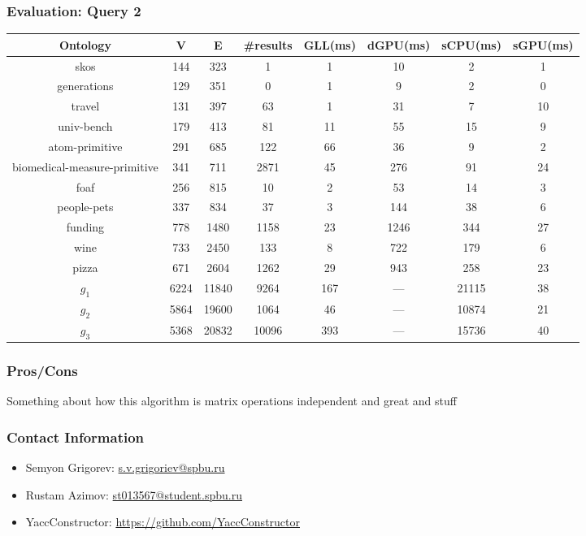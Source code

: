 \documentclass[xcolor=table]{beamer}
\begin{document}
\begin{frame}
  \transwipe[direction=90]
  \frametitle{Evaluation: Query 2}         
\begin{tabular}{ | c | c | c | c | c | c | c | c |}
\hline
Ontology & V & E & \#results & GLL(ms) & dGPU(ms) & sCPU(ms) & sGPU(ms)\\
\hline 
\hline
skos        & 144 & 323 & 1 & 1 & 10 & 2 & 1\\
generations & 129 & 351 & 0 & 1 & 9 & 2 & 0\\
travel      & 131 & 397 & 63 & 1 & 31 & 7 & 10\\
univ-bench  & 179 & 413 & 81 & 11 & 55 & 15 & 9\\
atom-primitive & 291 & 685 & 122 & 66 & 36 & 9 & 2\\
biomedical-measure-primitive & 341 & 711 & 2871 & 45 & 276 & 91 & 24\\
foaf        & 256 & 815 & 10 & 2 & 53 & 14 & 3\\
people-pets & 337 & 834 & 37 & 3 & 144 & 38 & 6\\
funding     & 778 & 1480 & 1158 & 23 & 1246 & 344 & 27\\
wine        & 733 & 2450 & 133 & 8 & 722 & 179 & 6\\
pizza       & 671 & 2604 & 1262 & 29 & 943 & 258 & 23\\
$g_{1}$     & 6224 & 11840 & 9264 & 167 & --- & 21115 & 38\\
$g_{2}$     & 5864 & 19600 & 1064 & 46 & --- & 10874 & 21\\
$g_{3}$     & 5368 & 20832 & 10096 & 393 & --- & 15736 & 40\\
\hline
\end{tabular}
\end{frame}     
            
            
\begin{frame}
  \transwipe[direction=90]
  \frametitle{Pros/Cons}         
Something about how this algorithm is matrix operations independent and great and stuff
\end{frame}           
            
\begin{frame}
\transwipe[direction=90]
\frametitle{Contact Information}
\begin{itemize}
  \item Semyon Grigorev: \href{mailto:s.v.grigoriev@spbu.ru}{s.v.grigoriev@spbu.ru}
  \item Rustam Azimov: \href{mailto:st013567@student.spbu.ru}{st013567@student.spbu.ru}
\end{itemize}
\begin{itemize}
  \item YaccConstructor: \href{https://github.com/YaccConstructor}{https://github.com/YaccConstructor}
\end{itemize}
\end{frame}
\end{document}

